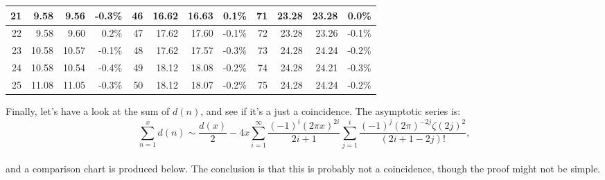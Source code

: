 \documentclass[12pt]{article}
\begin{document}
\begin{table}[h]
\begin{tabular}{|r|r|r|r|r|r|r|r|r|r|r|r|}
21 & 9.58 & 9.56 & -0.3\% & 46 & 16.62 & 16.63 & 0.1\% & 71 & 23.28 & 23.28 & 0.0\% \\ \hline
22 & 9.58 & 9.60 & 0.2\% & 47 & 17.62 & 17.60 & -0.1\% & 72 & 23.28 & 23.26 & -0.1\% \\ \hline
23 & 10.58 & 10.57 & -0.1\% & 48 & 17.62 & 17.57 & -0.3\% & 73 & 24.28 & 24.24 & -0.2\% \\ \hline
24 & 10.58 & 10.54 & -0.4\% & 49 & 18.12 & 18.08 & -0.2\% & 74 & 24.28 & 24.21 & -0.3\% \\ \hline
25 & 11.08 & 11.05 & -0.3\% & 50 & 18.12 & 18.07 & -0.2\% & 75 & 24.28 & 24.24 & -0.2\% \\ \hline


\end{tabular}
\end{table}

\newpage

Finally, let's have a look at the sum of $d(n)$, and see if it's a just a coincidence. The asymptotic series is:
\begin{equation} \nonumber
\sum_{n=1}^{x}d(n) \sim \frac{d(x)}{2}-4x\sum_{i=1}^{\infty}\frac{(-1)^i(2\pi x)^{2i}}{2i+1}\sum_{j=1}^{i} \frac{(-1)^j (2\pi)^{-2j}\zeta(2j)^{2}}{(2i+1-2j)!} \text{,}
\end{equation}\\
\noindent and a comparison chart is produced below. The conclusion is that this is probably not a coincidence, though the proof might not be simple.
\end{document}
